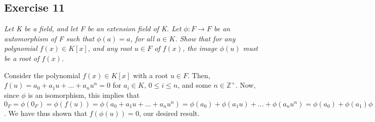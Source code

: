 \subsection*{Exercise 11}
\textit{Let K be a field, and let F be an extension field of K. Let $\phi: F \rightarrow F$ be an automorphism of F such that $\phi(a) = a$, for all $a \in K$. Show that for any polynomial $f(x) \in K[x]$, and any root $u \in F$ of $f(x)$, the image $\phi(u)$ must be a root of $f(x)$.}

\vspace{5 mm}
Consider the polynomial $f(x) \in K[x]$ with a root $u \in F$. Then, $f(u) = a_0 + a_1u + ... + a_nu^n = 0$ for $a_i \in K$, $0 \le i \le n$, and some $n \in \mathbb{Z}^+$. Now, since $\phi$ is an isomorphism, this implies that $0_F = \phi(0_F) = \phi(f(u)) = \phi(a_0 + a_1u + ... + a_nu^n) = \phi(a_0) + \phi(a_1u) + ... + \phi(a_nu^n) = \phi(a_0) + \phi(a_1)\phi(u) + ... + \phi(a_n)\phi(u^n) = a_0 + a_1\phi(u) + ... + a_n\phi(u)^n = f(\phi(u))$. We have thus shown that $f(\phi(u)) = 0$, our desired result.